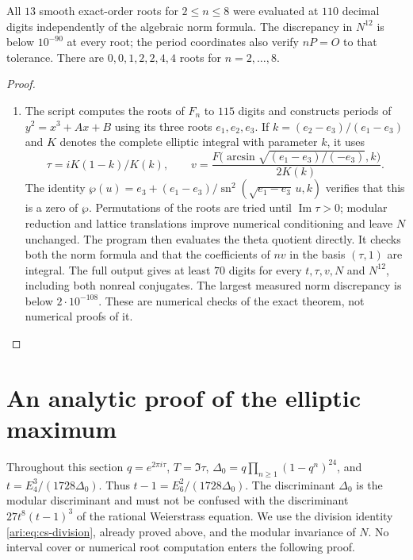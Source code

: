 \begin{proposition}\hypertarget{tag-000T}{}\label{ari:C.4.5}

All $13$ smooth exact-order roots for $2\le n\le8$ were evaluated
at $110$ decimal digits independently of the algebraic norm formula.
The discrepancy in $N^{12}$ is below $10^{-90}$ at every root;
the period coordinates also verify $nP=O$ to that tolerance.
There are $0,0,1,2,2,4,4$ roots for $n=2,\ldots,8$.
\end{proposition}


\begin{proof}
\begin{enumerate}[label=\arabic*.,leftmargin=*]
\item The script  computes the
roots of $F_n$ to $115$ digits and constructs periods of
$y^2=x^3+Ax+B$ using its three roots $e_1,e_2,e_3$. If
$k=(e_2-e_3)/(e_1-e_3)$ and $K$ denotes the complete elliptic
integral with parameter $k$, it uses
\[
 \tau=iK(1-k)/K(k),\qquad
 v=\frac{F\bigl(\arcsin\sqrt{(e_1-e_3)/(-e_3)},k\bigr)}{2K(k)}.
\]
The identity
$\wp(u)=e_3+(e_1-e_3)/\operatorname{sn}^2
(\sqrt{e_1-e_3}\,u,k)$ verifies that this is a zero of $\wp$.
Permutations of the roots are tried until $\operatorname{Im}\tau>0$;
modular reduction and lattice translations improve numerical
conditioning and leave $N$ unchanged. The program then evaluates
the theta quotient directly. It checks both the norm formula and
that the coefficients of $nv$ in the basis $(\tau,1)$ are integral.
The full output gives at least $70$ digits for every $t,\tau,v,N$
and $N^{12}$, including both nonreal conjugates. The largest measured
norm discrepancy is below $2\cdot10^{-108}$. These are numerical
checks of the exact theorem, not numerical proofs of it.
\end{enumerate}
\end{proof}


\section{An analytic proof of the elliptic maximum}

Throughout this section $q=e^{2\pi i\tau}$, $T=\Im\tau$,
$\Delta_0=q\prod_{n\ge1}(1-q^n)^{24}$, and
$t=E_4^3/(1728\Delta_0)$. Thus $t-1=E_6^2/(1728\Delta_0)$.
The discriminant $\Delta_0$ is the modular discriminant and must not
be confused with the discriminant $27t^8(t-1)^3$ of the rational
Weierstrass equation. We use the division identity
\eqref{ari:eq:cs-division}, already proved above, and the modular
invariance of $N$. No interval cover or numerical root computation
enters the following proof.

